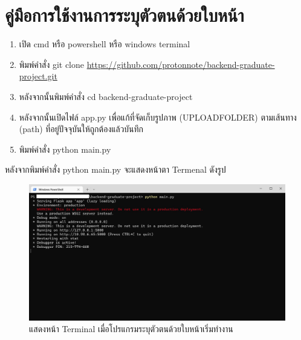 \section{คู่มือการใช้งานการระบุตัวตนด้วยใบหน้า}
\begin{enumerate}
  \item เปิด cmd หรือ powershell หรือ windows terminal
  \item พิมพ์คำสั่ง git clone \url{https://github.com/protonnote/backend-graduate-project.git}
  \item หลังจากนั้นพิมพ์คำสั่ง cd backend-graduate-project
  \item หลังจากนั้นเปิดไฟล์ app.py เพื่อแก้ที่จัดเก็บรูปภาพ (UPLOAD\textunderscore FOLDER) ตามเส้นทาง (path) ที่อยู่ปัจจุบันให้ถูกต้องแล้วบันทึก
  \item พิมพ์คำสั่ง python main.py
\end{enumerate}

หลังจากพิมพ์คำสั่ง python main.py จะแสดงหน้าตา Termenal ดังรูป
\begin{figure}[!ht]
  \begin{center}
    \includegraphics[scale=.4]{pic/server_start.png}
    \caption[หน้า Terminal เมื่อโปรแกรมระบุตัวตนด้วยใบหน้าเริ่มทำงาน]{แสดงหน้า Terminal เมื่อโปรแกรมระบุตัวตนด้วยใบหน้าเริ่มทำงาน}
    \label{fig:server_start}
  \end{center}
\end{figure}